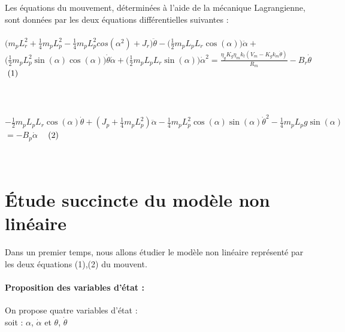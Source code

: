 \documentclass[12pt, a4paper, openany]{report}
\begin{document}
Les équations du mouvement, déterminées à l'aide de la mécanique Lagrangienne, sont données par les
deux équations différentielles suivantes : \\\\

$\bigg(m_{p}L_{r}^{2} + \frac{1}{4}m_{p}L_{p}^{2} - \frac{1}{4}m_{p}L_{p}^{2}cos(\alpha^{2}) + J_{r} \bigg)\ddot{\theta}- \bigg(\frac{1}{2}m_{p}L_{p}L_{r}\cos(\alpha) \bigg)\ddot{\alpha}+$\\  $\bigg(\frac{1}{2}m_{p}L_{p}^{2}\sin(\alpha)\cos(\alpha) \bigg)\dot{\theta}\dot{\alpha} + \bigg(\frac{1}{2}m_{p}L_{p}L_{r}\sin(\alpha) \bigg)\dot{\alpha}^{2}=\frac{\eta_{g}K_{g}\eta_{m}k_{t}(V_{m}- K_{g}k_{m}\dot{\theta})}{R_{m}}-B_{r}\dot{\theta}$ $\hspace{1mm}(1)$ \\\\\\\\ 

$-\frac{1}{2}m_{p}L_{p}L_{r}\cos(\alpha)\dot{\theta}+(J_{p}+\frac{1}{4}m_{p}L_{p}^{2})\ddot{\alpha}-\frac{1}{4}m_{p}L_{p}^{2}\cos(\alpha)\sin(\alpha)\dot{\theta}^{2}-\frac{1}{4}m_{p}L_{p}g\sin(\alpha)$\\$=-B_{p}\dot{\alpha}$   $\hspace{3mm}(2)$ \\\\\\
  

   


\section{Étude succincte du modèle non linéaire  }

Dans un premier temps, nous allons étudier le modèle non linéaire représenté par les deux équations (1),(2) du mouvent.

 \paragraph{Proposition des variables d'état :\\}

 On propose quatre variables d'état : \\
 soit : $\alpha$, $\dot{\alpha}$ et  $\theta$, $\dot{\theta}$\\
 
\end{document}
